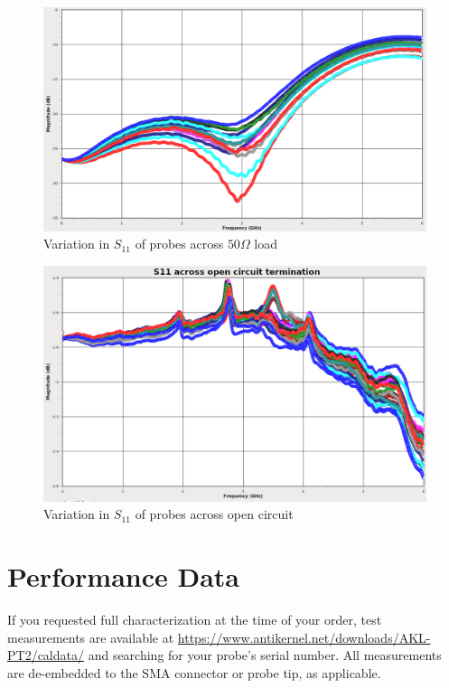 \documentclass[11pt]{article}
\begin{document}
\begin{figure}[h!]
\centering
\includegraphics[width=14cm]{s11-variation.png}
\caption{Variation in $S_{11}$ of probes across $50\Omega$ load}
\label{s11-open-variation}
\end{figure}

\begin{figure}[h!]
\centering
\includegraphics[width=14cm]{s11-open-variation.png}
\caption{Variation in $S_{11}$ of probes across open circuit}
\label{s11-variation}
\end{figure}

\FloatBarrier

\pagebreak
\section{Performance Data}

If you requested full characterization at the time of your order, test measurements are available at
\url{https://www.antikernel.net/downloads/AKL-PT2/caldata/} and searching for your probe's serial number. All
measurements are de-embedded to the SMA connector or probe tip, as applicable.
\end{document}
